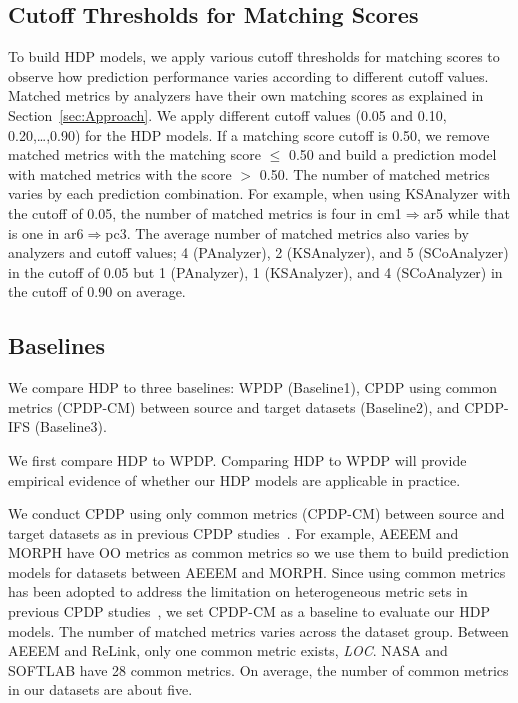\subsection{Cutoff Thresholds for Matching Scores}

To build HDP models, we apply
various cutoff thresholds for matching scores to observe how prediction
performance varies according to different cutoff values. Matched metrics
by analyzers have their own matching scores as explained in
Section~\ref{sec:Approach}. We apply different cutoff values (0.05 and 0.10,
0.20,\ldots,0.90) for the HDP models. If a
matching score cutoff is 0.50, we remove matched metrics with the
matching score $\leq$ 0.50 and build a prediction model with matched metrics
with the score $>$ 0.50. The number of matched metrics varies by each prediction
combination. For example, when using KSAnalyzer with the cutoff of 0.05, the
number of matched metrics is four in cm1$\Rightarrow$ar5 while that is one in
ar6$\Rightarrow$pc3. The average number of matched metrics also varies by
analyzers and cutoff values; 4 (PAnalyzer), 2 (KSAnalyzer), and 5 (SCoAnalyzer)
in the cutoff of 0.05 but 1 (PAnalyzer), 1 (KSAnalyzer), and 4 (SCoAnalyzer) in
the cutoff of 0.90 on average.

\subsection{Baselines}

We compare HDP to three baselines: WPDP (Baseline1), CPDP using common
metrics (CPDP-CM) between source and target datasets (Baseline2), and CPDP-IFS
(Baseline3).

We first compare HDP to WPDP. Comparing HDP
to WPDP will provide empirical evidence of whether our
HDP models are applicable in practice.


We conduct CPDP using only common metrics (CPDP-CM) between
source and target datasets as in previous CPDP
studies~\cite{He14,Ma12,Turhan09}.
For example, AEEEM and MORPH have OO metrics as common metrics so we use them to build prediction
models for datasets between AEEEM and MORPH. Since
using common metrics has been adopted to address the limitation on heterogeneous
metric sets in previous CPDP studies~\cite{He14,Ma12,Turhan09}, we set CPDP-CM
as a baseline to evaluate our HDP models.
The number of matched metrics varies across the dataset group. Between
AEEEM and ReLink, only one common metric exists, {\em LOC}.
NASA and SOFTLAB have 28 common metrics. On average, the number of common
metrics in our datasets are about five.

